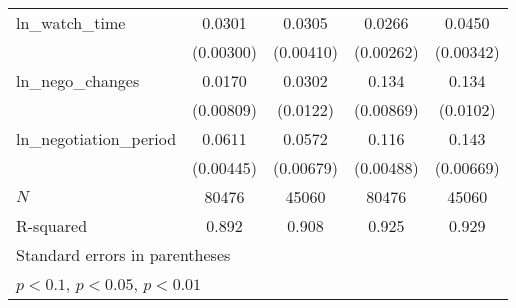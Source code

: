 {\begin{tabular}{l*{4}{c}}
ln\_watch\_time&      0.0301\sym{***}&      0.0305\sym{***}&      0.0266\sym{***}&      0.0450\sym{***}\\
            &   (0.00300)         &   (0.00410)         &   (0.00262)         &   (0.00342)         \\
\addlinespace
ln\_nego\_changes&      0.0170\sym{**} &      0.0302\sym{**} &       0.134\sym{***}&       0.134\sym{***}\\
            &   (0.00809)         &    (0.0122)         &   (0.00869)         &    (0.0102)         \\
\addlinespace
ln\_negotiation\_period&      0.0611\sym{***}&      0.0572\sym{***}&       0.116\sym{***}&       0.143\sym{***}\\
            &   (0.00445)         &   (0.00679)         &   (0.00488)         &   (0.00669)         \\
\midrule
\(N\)       &       80476         &       45060         &       80476         &       45060         \\
R-squared   &       0.892         &       0.908         &       0.925         &       0.929         \\
\bottomrule
\multicolumn{5}{l}{\footnotesize Standard errors in parentheses}\\
\multicolumn{5}{l}{\footnotesize \sym{*} \(p<0.1\), \sym{**} \(p<0.05\), \sym{***} \(p<0.01\)}\\
\end{tabular}
}

